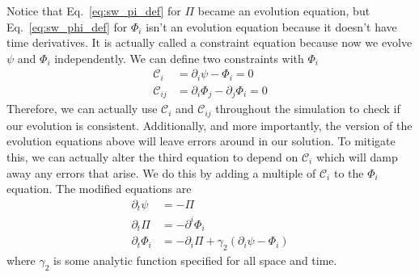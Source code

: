 \begin{bibunit}[unsrtnat]
Notice that Eq.~\ref{eq:sw_pi_def} for $\Pi$
became an evolution equation, but Eq.~\ref{eq:sw_phi_def} for $\Phi_i$ isn't an
evolution equation because it doesn't have time derivatives. It is actually
called a constraint equation because now we evolve $\psi$ and $\Phi_i$
independently. We can define two constraints with $\Phi_i$
\begin{align}
   \mathcal{C}_i &= \partial_i\psi - \Phi_i = 0 \\
   \mathcal{C}_{ij} &= \partial_i\Phi_j - \partial_j\Phi_i = 0
\end{align}
Therefore, we can actually use $\mathcal{C}_i$ and $\mathcal{C}_{ij}$ throughout
the simulation to check if our evolution is consistent. Additionally, and more
importantly, the version of the evolution equations above will leave errors
around in our solution. To mitigate this, we can actually alter the third
equation to depend on $\mathcal{C}_i$ which will damp away any errors that
arise. We do this by adding a multiple of $\mathcal{C}_i$ to the $\Phi_i$
equation. The modified equations are
\begin{align}
   \partial_t\psi &= -\Pi \\
   \partial_t\Pi &= -\partial^i\Phi_i \\
   \partial_t\Phi_i &= -\partial_i\Pi + \gamma_2(\partial_i\psi - \Phi_i)\label{eq:sw_phi_damped}
\end{align}
where $\gamma_2$ is some analytic function specified for all space and time.


\end{bibunit}

